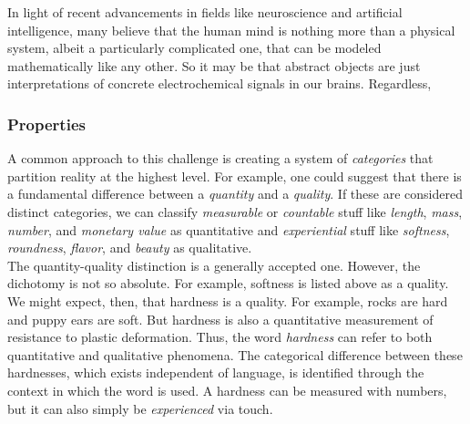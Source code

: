 In light of recent advancements in fields like neuroscience and artificial intelligence, many believe that the human mind is nothing more than a physical system, albeit a particularly complicated one, that can be modeled mathematically like any other. So it may be that abstract objects are just interpretations of concrete electrochemical signals in our brains. Regardless,  \\



\subsubsection{Properties}




A common approach to this challenge is creating a system of \textit{categories} that partition reality at the highest level. For example, one could suggest that there is a fundamental difference between a \textit{quantity} and a \textit{quality}. If these are considered distinct categories, we can classify \textit{measurable} or \textit{countable} stuff like \textit{length}, \textit{mass}, \textit{number}, and \textit{monetary value} as quantitative and \textit{experiential} stuff like \textit{softness}, \textit{roundness}, \textit{flavor}, and \textit{beauty} as qualitative. \\

The quantity-quality distinction is a generally accepted one. However, the dichotomy is not so absolute. For example, softness is listed above as a quality. We might expect, then, that hardness is a quality. For example, rocks are hard and puppy ears are soft. But hardness is also a quantitative measurement of resistance to plastic deformation. Thus, the word \textit{hardness} can refer to both quantitative and qualitative phenomena. The categorical difference between these hardnesses, which exists independent of language, is identified through the context in which the word is used. A hardness can be measured with numbers, but it can also simply be \textit{experienced} via touch. \\

